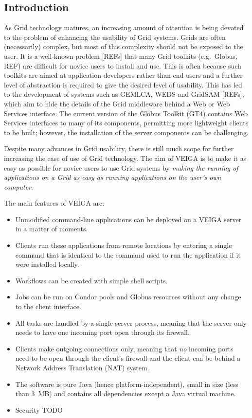 \documentclass[a4paper]{article}
\begin{document}
\begin{multicols}{2}

\section{Introduction}
As Grid technology matures, an increasing amount of attention is being devoted to the problem of enhancing the usability of Grid systems.  Grids are often (necessarily) complex, but most of this complexity should not be exposed to the user.  It is a well-known problem [REFs] that many Grid toolkits (e.g.\ Globus, REF) are difficult for novice users to install and use.  This is often because such toolkits are aimed at application developers rather than end users and a further level of abstraction is required to give the desired level of usability.  This has led to the development of systems such as GEMLCA, WEDS and GridSAM [REFs], which aim to hide the details of the Grid middleware behind a Web or Web Services interface.  The current version of the Globus Toolkit (GT4) contains Web Services interfaces to many of its components, permitting more lightweight clients to be built; however, the installation of the server components can be challenging.

Despite many advances in Grid usability, there is still much scope for further increasing the ease of use of Grid technology.  The aim of VEIGA is to make it as easy as possible for novice users to use Grid systems by {\em making the running of applications on a Grid as easy as running applications on the user's own computer\/}.

The main features of VEIGA are:
\begin{itemize}
\item Unmodified command-line applications can be deployed on a VEIGA server in a matter of moments.
\item Clients run these applications from remote locations by entering a single command that is identical to the command used to run the application if it were installed locally.
\item Workflows can be created with simple shell scripts.
\item Jobs can be run on Condor pools and Globus resources without any change to the client interface.
\item All tasks are handled by a single server process, meaning that the server only needs to have one incoming port open through its firewall.
\item Clients make outgoing connections only, meaning that {\em no\/} incoming ports need to be open through the client's firewall and the client can be behind a Network Address Translation (NAT) system.
\item The software is pure Java (hence platform-independent), small in size (less than 3~MB) and contains all dependencies except a Java virtual machine.
\item Security TODO
\end{itemize}


\end{multicols}
\end{document}
